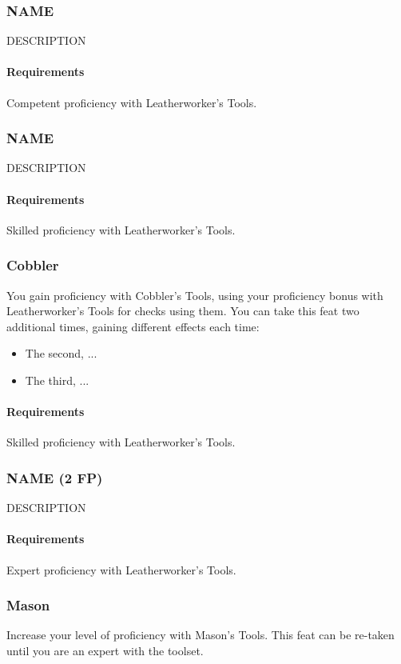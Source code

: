 \subsubsection{NAME} \label{feat::name}
    DESCRIPTION
    \paragraph{Requirements} Competent proficiency with Leatherworker's Tools.
\subsubsection{NAME} \label{feat::name}
    DESCRIPTION
    \paragraph{Requirements} Skilled proficiency with Leatherworker's Tools.
\subsubsection{Cobbler} \label{feat::cobbler}
    You gain proficiency with Cobbler's Tools, using your proficiency bonus with Leatherworker's Tools for checks using them.
    You can take this feat two additional times, gaining different effects each time:
    \begin{itemize}
        \item The second, ...
        \item The third, ...
    \end{itemize}
    \paragraph{Requirements} Skilled proficiency with Leatherworker's Tools.
\subsubsection{NAME (2 FP)} \label{feat::name}
    DESCRIPTION
    \paragraph{Requirements} Expert proficiency with Leatherworker's Tools.
\subsubsection{Mason} \label{feat::mason}
    Increase your level of proficiency with Mason's Tools.
    This feat can be re-taken until you are an expert with the toolset.
